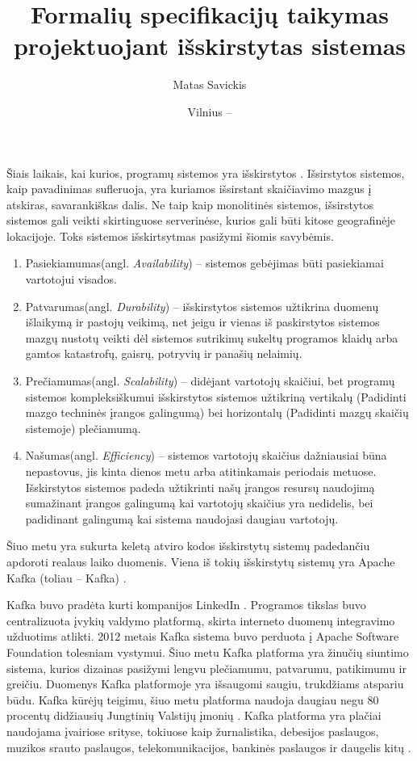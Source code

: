 \documentclass{VUMIFPSmagistrinis}
\title{Formalių specifikacijų taikymas projektuojant išskirstytas sistemas}
\author{Matas Savickis}
\date{Vilnius – \the\year}
\begin{document}
\maketitle

\tableofcontents


		Šiais laikais, kai kurios, programų sistemos yra išskirstytos \cite{mcr}. 
		Išsirstytos sistemos, kaip pavadinimas sufleruoja, yra kuriamos išsirstant skaičiavimo mazgus į atskiras, savarankiškas dalis.
		Ne taip kaip monolitinės sistemos, išsirstytos sistemos gali veikti skirtinguose serverinėse, kurios gali būti kitose geografinėje lokacijoje.
		Toks sistemos išskirtsytmas pasižymi šiomis savybėmis.
		\begin{enumerate}
			\item{Pasiekiamumas(angl. {\it Availability}) -- sistemos gebėjimas būti pasiekiamai vartotojui visados.}
			\item{Patvarumas(angl. {\it Durability}) -- išskirstytos sistemos užtikrina duomenų išlaikymą ir pastojų veikimą, net jeigu ir vienas iš paskirstytos sistemos mazgų nustotų veikti dėl sistemos sutrikimų sukeltų programos klaidų arba gamtos katastrofų, gaisrų, potryvių ir panašių nelaimių.}
			\item{Prečiamumas(angl. {\it Scalability}) -- didėjant vartotojų skaičiui, bet programų sistemos kompleksiškumui išskirstytos sistemos užtikriną vertikalų (Padidinti mazgo techninės įrangos galingumą) bei horizontalų (Padidinti mazgų skaičių sistemoje) plečiamumą.}
			\item{Našumas(angl. {\it Efficiency}) -- sistemos vartotojų skaičius dažniausiai būna nepastovus, jis kinta dienos metu arba atitinkamais periodais metuose. Išskirstytos sistemos padeda užtikrinti našų įrangos resursų naudojimą sumažinant įrangos galingumą kai vartotojų skaičius yra nedidelis, bei padidinant galingumą kai sistema naudojasi daugiau vartotojų.}
		\end{enumerate}
		Šiuo metu yra sukurta keletą atviro kodos išskirstytų sistemų padedančiu apdoroti realaus laiko duomenis.	
		Viena iš tokių išskirstytų sistemų yra Apache Kafka (toliau -- Kafka) \cite{kfk}.


 		Kafka buvo pradėta kurti kompanijos LinkedIn \cite{kfk}. Programos tikslas buvo centralizuota įvykių valdymo platformą, skirta interneto duomenų integravimo užduotims atlikti.
		2012 metais Kafka sistema buvo perduota į Apache Software Foundation tolesniam vystymui.
		Šiuo metu Kafka platforma yra žinučių siuntimo sistema, kurios dizainas pasižymi lengvu plečiamumu, patvarumu, patikimumu ir greičiu.
		Duomenys Kafka platformoje yra išsaugomi saugiu, trukdžiams atspariu būdu.
		Kafka kūrėjų teigimu, šiuo metu platforma naudoja daugiau negu 80 procentų didžiausių Jungtinių Valstijų įmonių \cite{kfk}.
		Kafka platforma yra plačiai naudojama įvairiose srityse, tokiuose kaip žurnalistika, debesijos paslaugos, muzikos srauto paslaugos, telekomunikacijos, bankinės paslaugos ir daugelis kitų \cite{kfk}.
\end{document}
